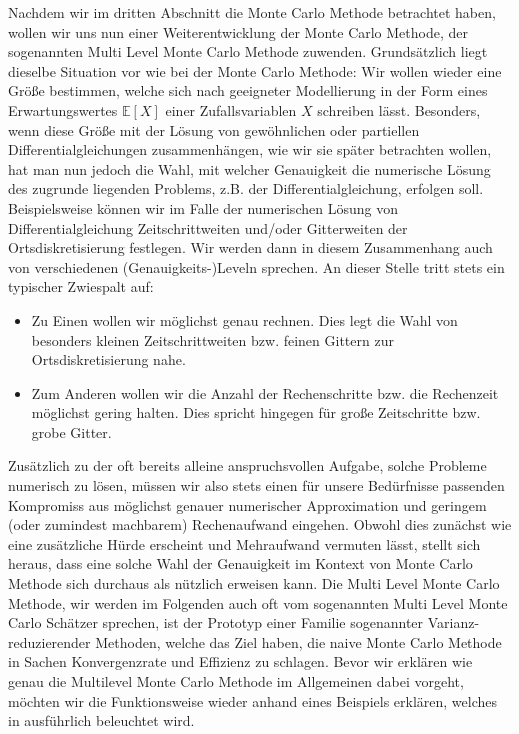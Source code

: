 
Nachdem wir im dritten Abschnitt die Monte Carlo Methode betrachtet haben, wollen wir uns nun einer Weiterentwicklung der Monte Carlo Methode, der sogenannten Multi Level Monte Carlo Methode zuwenden. Grundsätzlich liegt dieselbe Situation vor wie bei der Monte Carlo Methode:
Wir wollen wieder eine Größe bestimmen, welche sich nach geeigneter Modellierung in der Form eines Erwartungswertes $ \mathbb{E}[X] $ einer Zufallsvariablen $ X $ schreiben lässt. Besonders, wenn diese Größe mit der Lösung von gewöhnlichen oder partiellen Differentialgleichungen zusammenhängen, wie wir sie später betrachten wollen, hat man nun jedoch die Wahl, mit welcher Genauigkeit die numerische Lösung des zugrunde liegenden Problems, z.B. der Differentialgleichung, erfolgen soll. Beispielsweise können wir im Falle der numerischen Lösung von Differentialgleichung Zeitschrittweiten und/oder Gitterweiten der Ortsdiskretisierung festlegen. Wir werden dann in diesem Zusammenhang auch von verschiedenen (Genauigkeits-)Leveln sprechen. An dieser Stelle tritt stets ein typischer Zwiespalt auf:
\begin{itemize}
	\item Zu Einen wollen wir möglichst genau rechnen. Dies legt die Wahl von besonders kleinen Zeitschrittweiten bzw. feinen Gittern zur Ortsdiskretisierung nahe.
	\item Zum Anderen wollen wir die Anzahl der Rechenschritte bzw. die Rechenzeit möglichst gering halten. Dies spricht hingegen für große Zeitschritte bzw. grobe Gitter.
\end{itemize}
Zusätzlich zu der oft bereits alleine anspruchsvollen Aufgabe, solche Probleme numerisch zu lösen, müssen wir also stets einen für unsere Bedürfnisse passenden Kompromiss aus möglichst genauer numerischer Approximation und geringem (oder zumindest machbarem) Rechenaufwand eingehen. Obwohl dies zunächst wie eine zusätzliche Hürde erscheint und Mehraufwand vermuten lässt, stellt sich heraus, dass eine solche Wahl der Genauigkeit im Kontext von Monte Carlo Methode sich durchaus als nützlich erweisen kann. 
Die Multi Level Monte Carlo Methode, wir werden im Folgenden auch oft vom sogenannten Multi Level Monte Carlo Schätzer sprechen, ist der Prototyp einer Familie sogenannter Varianz-reduzierender Methoden, welche das Ziel haben, die naive Monte Carlo Methode in Sachen Konvergenzrate und Effizienz zu schlagen. Bevor wir erklären wie genau die Multilevel Monte Carlo Methode im Allgemeinen dabei vorgeht, möchten wir die Funktionsweise wieder anhand eines Beispiels erklären, welches in \cite{heinrich2001multilevel} ausführlich beleuchtet wird.

